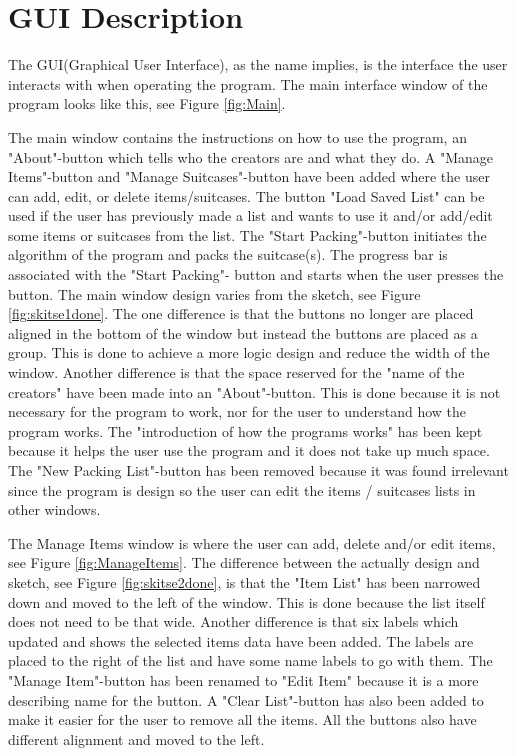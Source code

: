 \section{GUI Description}
\label{sec:GUI}
The GUI(Graphical User Interface), as the name implies, is the interface the user interacts with when operating the program.
The main interface window of the program looks like this, see Figure \ref{fig:Main}.


The main window contains the instructions on how to use the program, an "About"-button which tells who the creators are and what they do. A "Manage Items"-button and "Manage Suitcases"-button have been added where the user can add, edit, or delete items/suitcases. The button "Load Saved List" can be used if the user has previously made a list and wants to use it and/or add/edit some items or suitcases from the list. The "Start Packing"-button initiates the algorithm of the program and packs the suitcase(s). The progress bar is associated with the "Start Packing"- button and starts when the user presses the button.
The main window design varies from the sketch, see Figure \ref{fig:skitse1done}. The one difference is that the buttons no longer are placed aligned in the bottom of the window but instead the buttons are placed as a group. This is done to achieve a more logic design and reduce the width of the window. Another difference is that the space reserved for the "name of the creators" have been made into an "About"-button. This is done because it is not necessary for the program to work, nor for the user to understand how the program works. The "introduction of how the programs works" has been kept because it helps the user use the program and it does not take up much space.
The "New Packing List"-button has been removed because it was found irrelevant since the program is design so the user can edit the items / suitcases lists in other windows.

The Manage Items window is where the user can add, delete and/or edit items, see Figure \ref{fig:ManageItems}. The difference between the actually design and sketch, see Figure \ref{fig:skitse2done}, is that the "Item List" has been narrowed down and moved to the left of the window. This is done because the list itself does not need to be that wide. Another difference is that six labels which updated and shows the selected items data have been added. The labels are placed to the right of the list and have some name labels to go with them. The "Manage Item"-button has been renamed to "Edit Item" because it is a more describing name for the button. A "Clear List"-button has also been added to make it easier for the user to remove all the items. All the buttons also have different alignment and moved to the left.

